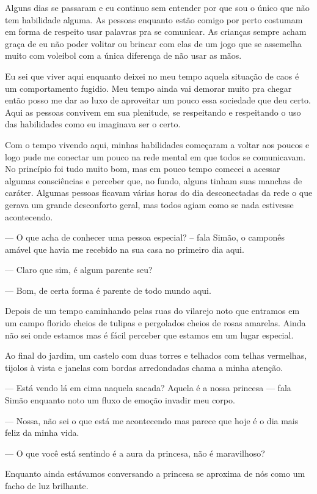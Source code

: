Alguns dias se passaram e eu continuo sem entender por que sou o único que não tem habilidade alguma. As pessoas enquanto estão comigo por perto costumam em forma de respeito usar palavras pra se comunicar. As crianças sempre acham graça de eu não poder volitar ou brincar com elas de um jogo que se assemelha muito com voleibol com a única diferença de não usar as mãos.

Eu sei que viver aqui enquanto deixei no meu tempo aquela situação de caos é um comportamento fugidio. Meu tempo ainda vai demorar muito pra chegar então posso me dar ao luxo de aproveitar um pouco essa sociedade que deu certo. Aqui as pessoas convivem em sua plenitude, se respeitando e respeitando o uso das habilidades como eu imaginava ser o certo.

Com o tempo vivendo aqui, minhas habilidades começaram a voltar aos poucos e logo pude me conectar um pouco na rede mental em que todos se comunicavam. No princípio foi tudo muito bom, mas em pouco tempo comecei a acessar algumas consciências e perceber que, no fundo, alguns tinham suas manchas de caráter. Algumas pessoas ficavam várias horas do dia desconectadas da rede o que gerava um grande desconforto geral, mas todos agiam como se nada estivesse acontecendo.

— O que acha de conhecer uma pessoa especial? -- fala Simão, o camponês amável que havia me recebido na sua casa no primeiro dia aqui.  

— Claro que sim, é algum parente seu?

— Bom, de certa forma é parente de todo mundo aqui.

Depois de um tempo caminhando pelas ruas do vilarejo noto que entramos em um campo florido cheios de tulipas e pergolados cheios de rosas amarelas. Ainda não sei onde estamos mas é fácil perceber que estamos em um lugar especial.

Ao final do jardim, um castelo com duas torres e telhados com telhas vermelhas, tijolos à vista e janelas com bordas arredondadas chama a minha atenção.

— Está vendo lá em cima naquela sacada? Aquela é a nossa princesa — fala Simão enquanto noto um fluxo de emoção invadir meu corpo.

— Nossa, não sei o que está me acontecendo mas parece que hoje é o dia mais feliz da minha vida.

— O que você está sentindo é a aura da princesa, não é maravilhoso?

Enquanto ainda estávamos conversando a princesa se aproxima de nós como um facho de luz brilhante.

